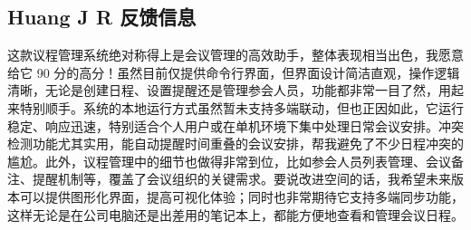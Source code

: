 \documentclass[a4paper, twoside, utf8]{ctexart}
\begin{document}
    \subsection{Huang J R 反馈信息}

    这款议程管理系统绝对称得上是会议管理的高效助手，整体表现相当出色，我愿意给它 90 分的高分！虽然目前仅提供命令行界面，但界面设计简洁直观，操作逻辑清晰，无论是创建日程、设置提醒还是管理参会人员，功能都非常一目了然，用起来特别顺手。系统的本地运行方式虽然暂未支持多端联动，但也正因如此，它运行稳定、响应迅速，特别适合个人用户或在单机环境下集中处理日常会议安排。冲突检测功能尤其实用，能自动提醒时间重叠的会议安排，帮我避免了不少日程冲突的尴尬。此外，议程管理中的细节也做得非常到位，比如参会人员列表管理、会议备注、提醒机制等，覆盖了会议组织的关键需求。要说改进空间的话，我希望未来版本可以提供图形化界面，提高可视化体验；同时也非常期待它支持多端同步功能，这样无论是在公司电脑还是出差用的笔记本上，都能方便地查看和管理会议日程。
	
\end{document}
